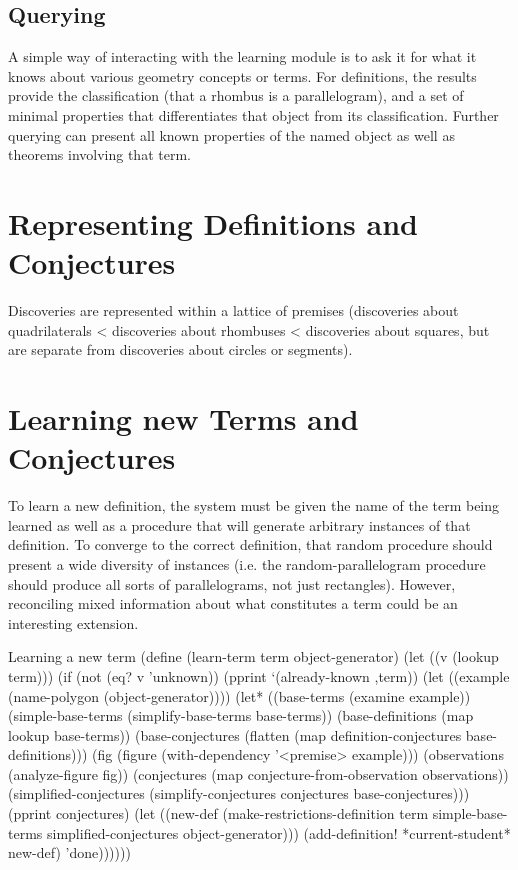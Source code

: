 \subsection{Querying}

A simple way of interacting with the learning module is to ask it for
what it knows about various geometry concepts or terms. For
definitions, the results provide the classification (that a rhombus is
a parallelogram), and a set of minimal properties that differentiates
that object from its classification. Further querying can present all
known properties of the named object as well as theorems involving
that term.

\section{Representing Definitions and Conjectures}

Discoveries are represented within a lattice of premises (discoveries
about quadrilaterals < discoveries about rhombuses < discoveries about
squares, but are separate from discoveries about circles or segments).


\section{Learning new Terms and Conjectures}

To learn a new definition, the system must be given the name of the
term being learned as well as a procedure that will generate arbitrary
instances of that definition. To converge to the correct definition,
that random procedure should present a wide diversity of instances
(i.e. the random-parallelogram procedure should produce all sorts of
parallelograms, not just rectangles). However, reconciling mixed
information about what constitutes a term could be an interesting
extension.

\begin{code-listing}{Learning a new term}
(define (learn-term term object-generator)
  (let ((v (lookup term)))
    (if (not (eq? v 'unknown))
        (pprint `(already-known ,term))
        (let ((example (name-polygon (object-generator))))
          (let* ((base-terms (examine example))
                 (simple-base-terms (simplify-base-terms base-terms))
                 (base-definitions (map lookup base-terms))
                 (base-conjectures (flatten (map definition-conjectures
                                                 base-definitions)))
                 (fig (figure (with-dependency '<premise> example)))
                 (observations (analyze-figure fig))
                 (conjectures (map conjecture-from-observation observations))
                 (simplified-conjectures
                  (simplify-conjectures conjectures base-conjectures)))
            (pprint conjectures)
            (let ((new-def
                   (make-restrictions-definition
                    term
                    simple-base-terms
                    simplified-conjectures
                    object-generator)))
              (add-definition! *current-student* new-def)
              'done))))))
\end{code-listing}

